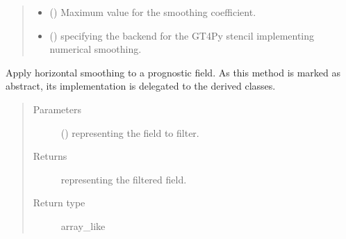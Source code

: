 \documentclass[letterpaper,10pt,english]{sphinxmanual}
\begin{document}
\begin{fulllineitems}
\begin{fulllineitems}
\begin{quote}
\begin{description}
\begin{itemize}
\item {} 
 () \textendash{} Maximum value for the smoothing coefficient.

\item {} 
 () \textendash{}  specifying the backend for the GT4Py stencil implementing numerical smoothing.

\end{itemize}

\end{description}\end{quote}

\end{fulllineitems}


\begin{fulllineitems}
\label{\detokenize{api:dycore.horizontal_smoothing.HorizontalSmoothing.apply}}
Apply horizontal smoothing to a prognostic field.
As this method is marked as abstract, its implementation is delegated to the derived classes.
\begin{quote}\begin{description}
\item[{Parameters}] \leavevmode
{} () \textendash{}  representing the field to filter.

\item[{Returns}] \leavevmode
{} representing the filtered field.

\item[{Return type}] \leavevmode
array\_like

\end{description}\end{quote}

\end{fulllineitems}



\end{fulllineitems}
\end{document}
